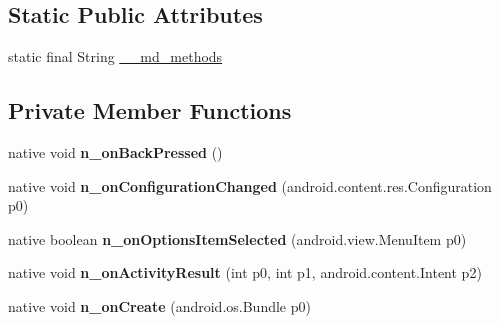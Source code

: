 \subsection*{Static Public Attributes}
\begin{DoxyCompactItemize}
\item 
static final String \hyperlink{classmd5b60ffeb829f638581ab2bb9b1a7f4f3f_1_1FormsAppCompatActivity_a2cb4fae3ad0f7b38c85c94c344df5089}{\+\_\+\+\_\+md\+\_\+methods}
\end{DoxyCompactItemize}
\subsection*{Private Member Functions}
\begin{DoxyCompactItemize}
\item 
\mbox{\label{classmd5b60ffeb829f638581ab2bb9b1a7f4f3f_1_1FormsAppCompatActivity_a900a0e82430d75a18dc20857da07f061}} 
native void {\bfseries n\+\_\+on\+Back\+Pressed} ()
\item 
\mbox{\label{classmd5b60ffeb829f638581ab2bb9b1a7f4f3f_1_1FormsAppCompatActivity_aac0346e9a23dc8d135e4c489d5890812}} 
native void {\bfseries n\+\_\+on\+Configuration\+Changed} (android.\+content.\+res.\+Configuration p0)
\item 
\mbox{\label{classmd5b60ffeb829f638581ab2bb9b1a7f4f3f_1_1FormsAppCompatActivity_a8fb8ee72349cccdb3dcc895b6691505e}} 
native boolean {\bfseries n\+\_\+on\+Options\+Item\+Selected} (android.\+view.\+Menu\+Item p0)
\item 
\mbox{\label{classmd5b60ffeb829f638581ab2bb9b1a7f4f3f_1_1FormsAppCompatActivity_a9a3a9d2f993a2d3b98d65006ed85bd7c}} 
native void {\bfseries n\+\_\+on\+Activity\+Result} (int p0, int p1, android.\+content.\+Intent p2)
\item 
\mbox{\label{classmd5b60ffeb829f638581ab2bb9b1a7f4f3f_1_1FormsAppCompatActivity_a6bc254edf45b4b316595aac2cc544b5e}} 
native void {\bfseries n\+\_\+on\+Create} (android.\+os.\+Bundle p0)

\end{DoxyCompactItemize}
